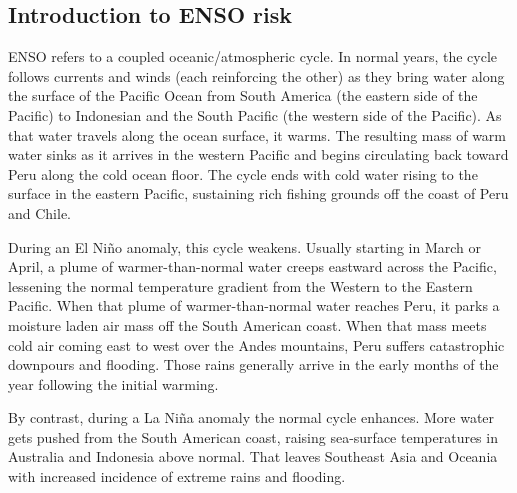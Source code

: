 \documentclass[authoryear]{article}
\begin{document}
\subsection{Introduction to ENSO risk}
ENSO refers to a coupled oceanic/atmospheric cycle. In normal years, the cycle follows currents and winds (each reinforcing the other) as they bring water along the surface of the Pacific Ocean from South America (the eastern side of the Pacific) to Indonesian and the South Pacific (the western side of the Pacific). As that water travels along the ocean surface, it warms. The resulting mass of warm water sinks as it arrives in the western Pacific and begins circulating back toward Peru along the cold ocean floor. The cycle ends with cold water rising to the surface in the eastern Pacific, sustaining rich fishing grounds off the coast of Peru and Chile.

During an El Ni\~no anomaly, this cycle weakens. Usually starting in March or April, a plume of warmer-than-normal water creeps eastward across the Pacific, lessening the normal temperature gradient from the Western to the Eastern Pacific. When that plume of warmer-than-normal water reaches Peru, it parks a moisture laden air mass off the South American coast. When that mass meets cold air coming east to west over the Andes mountains, Peru suffers catastrophic downpours and flooding. Those rains generally arrive in the early months of the year following the initial warming.

By contrast, during a La Ni\~na anomaly the normal cycle enhances. More water gets pushed from the South American coast, raising sea-surface temperatures in Australia and Indonesia above normal. That leaves Southeast Asia and Oceania with increased incidence of extreme rains and flooding.
\end{document}
